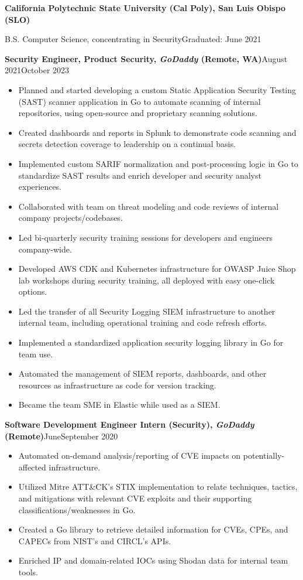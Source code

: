 \documentclass[12pt]{article}
\renewcommand\Large{\fontsize{15.5}{18}}
\newcommand{\sepspacing}{1em}
\newcommand{\halfsepspacing}{0.5em}
\newcommand{\itemspacing}{0.15pt}
\newcommand{\sep}{
  \vspace{\sepspacing}
}
\newcommand{\resumesection}[1]{
  \sep
  \noindent\Large{\textbf{#1}}\hfill\normalsize
}
\newcommand{\resumelistitem}[1]{
  \item{\fontsize{11.5}{18}#1}
}
\newcommand{\resumejobtitle}[5]{
  \vspace{\halfsepspacing}
  \noindent\normalsize{\textbf{#1, \textit{#2} (#3)}}\hfill\small{#4\textemdash#5}
}
\newcommand{\education}{
  \resumesection{Education}

    \indent\textbf{California Polytechnic State University (Cal Poly), San Luis Obispo (SLO)}

    \indent\indent B.S. Computer Science, concentrating in Security\hfill Graduated: June 2021
}
\begin{document}
  \pagestyle{resumeheader}

  \education

  \resumesection{Work Experience}

    \resumejobtitle{Security Engineer, Product Security}{GoDaddy}{Remote, WA}{August 2021}{October 2023}

    \begin{itemize}
      \setlength{\itemsep}{\itemspacing}
      \resumelistitem{Planned and started developing a custom Static Application Security Testing (SAST)
        scanner application in Go to automate scanning of internal repositories,
        using open-source and proprietary scanning solutions.}
      \resumelistitem{Created dashboards and reports in Splunk to demonstrate code scanning and secrets detection
        coverage to leadership on a continual basis.}
      \resumelistitem{Implemented custom SARIF normalization and post-processing logic in Go
        to standardize SAST results and enrich developer and security analyst experiences.}
      \resumelistitem{Collaborated with team on threat modeling and code reviews of internal company projects/codebases.}
      \resumelistitem{Led bi-quarterly security training sessions for developers and engineers company-wide.}
      \resumelistitem{Developed AWS CDK and Kubernetes infrastructure for OWASP Juice Shop lab workshops during security training,
        all deployed with easy one-click options.}
      \resumelistitem{Led the transfer of all Security Logging SIEM infrastructure to another internal team,
        including operational training and code refresh efforts.}
      \resumelistitem{Implemented a standardized application security logging library in Go for team use.}
      \resumelistitem{Automated the management of SIEM reports, dashboards, and other resources as infrastructure as code for version tracking.}
      \resumelistitem{Became the team SME in Elastic while used as a SIEM.}
    \end{itemize}

    \resumejobtitle{Software Development Engineer Intern (Security)}{GoDaddy}{Remote}{June}{September 2020}

    \begin{itemize}
      \setlength{\itemsep}{\itemspacing}
      \resumelistitem{Automated on-demand analysis/reporting of CVE impacts on potentially-affected infrastructure.}
      \resumelistitem{Utilized Mitre ATT\&CK's STIX implementation to relate
        techniques, tactics, and mitigations with relevant CVE
        exploits and their supporting classifications/weaknesses in Go.}
      \resumelistitem{Created a Go library to retrieve detailed information for
        CVEs, CPEs, and CAPECs from NIST's and CIRCL's APIs.}
      \resumelistitem{Enriched IP and domain-related IOCs using Shodan data for internal team tools.}
    \end{itemize}
\end{document}
